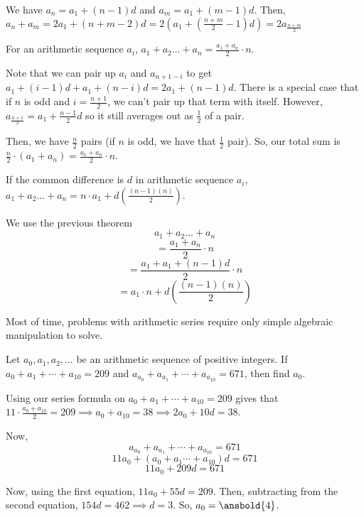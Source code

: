 \documentclass[11pt]{article}
\begin{document}
\begin{pro}
We have $a_{n}=a_{1}+(n-1)d$ and $a_{m}=a_{1}+(m-1)d$. Then, $a_{n}+a_{m}=2a_{1}+(n+m-2)d=2(a_{1}+(\frac{n+m}{2}-1)d)=2a_{\frac{n+m}{2}}$
\end{pro}

\begin{theo}
For an arithmetic sequence $a_{i}$, $a_{1}+a_{2}\ldots + a_{n}=\frac{a_{1}+a_{n}}{2}\cdot n$.
\end{theo}

\begin{pro}
Note that we can pair up $a_{i}$ and $a_{n+1-i}$ to get $a_{1}+(i-1)d+a_{1}+(n-i)d=2a_{1}+(n-1)d$. There is a special case that if $n$ is odd and $i=\frac{n+1}{2}$, we can't pair up that term with itself. However, $a_{\frac{n+1}{2}}=a_{1}+\frac{n-1}{2}d$ so it still averages out as $\frac{1}{2}$ of a pair.

Then, we have $\frac{n}{2}$ pairs (if $n$ is odd, we have that $\frac{1}{2}$ pair). So, our total sum is
$\frac{n}{2}\cdot (a_{1}+a_{n})=\frac{a_{1}+a_{n}}{2}\cdot n$.
\end{pro}

\begin{theo}
If the common difference is $d$ in arithmetic sequence $a_{i}$, $a_{1}+a_{2}\ldots + a_{n}=n\cdot a_{1}+d(\frac{(n-1)(n)}{2})$.
\end{theo}

\begin{pro}
We use the previous theorem
$$a_{1}+a_{2}\ldots + a_{n}$$
$$=\frac{a_{1}+a_{n}}{2}\cdot n$$
$$=\frac{a_{1}+a_{1}+(n-1)d}{2}\cdot n$$
$$=a_{1}\cdot n + d(\frac{(n-1)(n)}{2})$$
\end{pro}

Most of time, problems with arithmetic series require only simple algebraic manipulation to solve.

\begin{exam}
Let $a_0, a_1, a_2, \ldots$ be an arithmetic sequence of positive integers. If $a_0 + a_1 + \cdots + a_{10} = 209$ and $a_{a_{0}} +
a_{a_{1}} + \cdots + a_{a_{10}} = 671$, then find $a_0$.
\end{exam}

\begin{sol}
Using our series formula on $a_0 + a_1 + \cdots + a_{10} = 209$ gives that $11\cdot \frac{a_{0}+a_{10}}{2}=209\implies a_{0}+a_{10}=38\implies 2a_{0}+10d=38$.

Now,
$$a_{a_{0}}+a_{a_{1}} + \cdots + a_{a_{10}} = 671$$
$$11a_{0}+(a_{0}+a_{1}\cdots + a_{10})d=671$$
$$11a_{0}+209d=671$$

Now, using the first equation, $11a_{0}+55d=209$. Then, subtracting from the second equation, $154d=462\implies d =3$. So, $a_{0}=\ansbold{4}$.
\end{sol}
\end{document}
